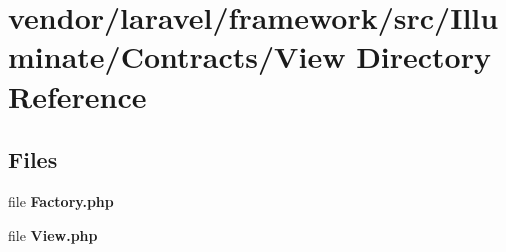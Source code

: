 \section{vendor/laravel/framework/src/\+Illuminate/\+Contracts/\+View Directory Reference}
\label{dir_88c71d3a0d62e5a5fd4eabca6c662e97}
\subsection*{Files}
\begin{DoxyCompactItemize}
\item 
file {\bf Factory.\+php}
\item 
file {\bf View.\+php}
\end{DoxyCompactItemize}
